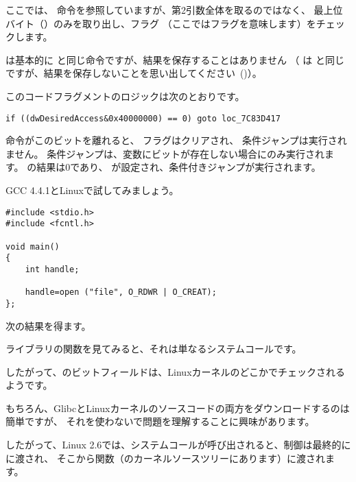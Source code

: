 ここでは、 \TEST 命令を参照していますが、第2引数全体を取るのではなく、
最上位バイト（）のみを取り出し、フラグ
（ここではフラグを意味します）をチェックします。

\TEST は基本的に \AND と同じ命令ですが、結果を保存することはありません
（ \CMP は \SUB と同じですが、結果を保存しないことを思い出してください~()）。

このコードフラグメントのロジックは次のとおりです。

\begin{lstlisting}[style=customc]
if ((dwDesiredAccess&0x40000000) == 0) goto loc_7C83D417
\end{lstlisting}


\AND 命令がこのビットを離れると、 \ZF フラグはクリアされ、
\JZ 条件ジャンプは実行されません。 
条件ジャンプは、変数にビットが存在しない場合にのみ実行されます。 
\AND の結果は0であり、 \ZF が設定され、条件付きジャンプが実行されます。

GCC 4.4.1とLinuxで試してみましょう。

\begin{lstlisting}[style=customc]
#include <stdio.h>
#include <fcntl.h>

void main()
{
	int handle;

	handle=open ("file", O_RDWR | O_CREAT);
};
\end{lstlisting}

次の結果を得ます。




ライブラリの関数を見てみると、それは単なるシステムコールです。



したがって、のビットフィールドは、Linuxカーネルのどこかでチェックされるようです。

もちろん、GlibcとLinuxカーネルのソースコードの両方をダウンロードするのは簡単ですが、
それを使わないで問題を理解することに興味があります。

したがって、Linux 2.6では、システムコールが呼び出されると、制御は最終的にに渡され、
そこから関数（のカーネルソースツリーにあります）に渡されます。

